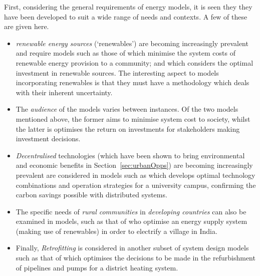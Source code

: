 First, considering the general requirements of energy models, it is seen they they have been developed to suit a wide range of needs and contexts. A few of these are given here. 
\begin{itemize}
	\item \emph{renewable energy sources} (`renewables') are becoming increasingly prevalent and require models such as those of \citet{Cai2009a} which minimise the system costs of renewable energy provision to a community; and \citet{Fleten2007} which considers the optimal investment in renewable sources. The interesting aspect to models incorporating renewables is that they must have a methodology which deals with their inherent uncertainty. 
	\item The \emph{audience} of the models varies between instances. Of the two models mentioned above, the former aims to minimise system cost to society, whilst the latter is optimises the return on investments for stakeholders making investment decisions.
	\item \emph{Decentralised} technologies (which have been shown to bring environmental and economic benefits in Section~\ref{sec:urbanOpps}) are becoming increasingly prevalent are considered in models such as \citet{Ren2010} which develops optimal technology combinations and operation strategies for a university campus, confirming the carbon savings possible with distributed systems. 
	\item The specific needs of \emph{rural communities} in \emph{developing countries} can also be examined in models, such as that of \citet{Kumaravel2012} who optimise an energy supply system (making use of renewables) in order to electrify a village in India. 
	\item Finally, \emph{Retrofitting} is considered in another subset of system design models such as that of \citet{Bojic2010} which optimises the decisions to be made in the refurbishment of pipelines and pumps for a district heating system.
\end{itemize}

